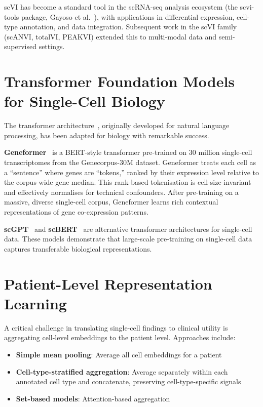 scVI has become a standard tool in the scRNA-seq analysis ecosystem (the scvi-tools package, Gayoso et al.~\cite{gayoso2022python}), with applications in differential expression, cell-type annotation, and data integration. Subsequent work in the scVI family (scANVI, totalVI, PEAKVI) extended this to multi-modal data and semi-supervised settings.

\section{Transformer Foundation Models for Single-Cell Biology}

The transformer architecture~\cite{vaswani2017attention}, originally developed for natural language processing, has been adapted for biology with remarkable success.

\textbf{Geneformer}~\cite{theodoris2023transfer} is a BERT-style transformer pre-trained on 30 million single-cell transcriptomes from the Genecorpus-30M dataset. Geneformer treats each cell as a ``sentence'' where genes are ``tokens,'' ranked by their expression level relative to the corpus-wide gene median. This rank-based tokenisation is cell-size-invariant and effectively normalises for technical confounders. After pre-training on a massive, diverse single-cell corpus, Geneformer learns rich contextual representations of gene co-expression patterns.

\textbf{scGPT}~\cite{cui2024scgpt} and \textbf{scBERT}~\cite{yang2022scbert} are alternative transformer architectures for single-cell data. These models demonstrate that large-scale pre-training on single-cell data captures transferable biological representations.

\section{Patient-Level Representation Learning}

A critical challenge in translating single-cell findings to clinical utility is aggregating cell-level embeddings to the patient level. Approaches include:

\begin{itemize}
    \item \textbf{Simple mean pooling}: Average all cell embeddings for a patient
    \item \textbf{Cell-type-stratified aggregation}: Average separately within each annotated cell type and concatenate, preserving cell-type-specific signals
    \item \textbf{Set-based models}: Attention-based aggregation
\end{itemize}

